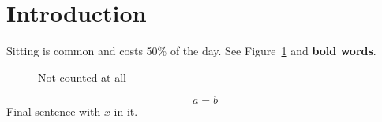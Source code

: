 \documentclass{article}
\begin{document}
\section{Introduction}
Sitting is common \cite{smith2020} and costs 50\% of the day. %
See Figure~\ref{fig:one} and \textbf{bold words}.
\begin{figure}
\caption{Not counted at all}
\label{fig:one}
\end{figure}
\begin{equation*}
a = b
\end{equation*}
Final sentence with $x$ in it.
\end{document}
